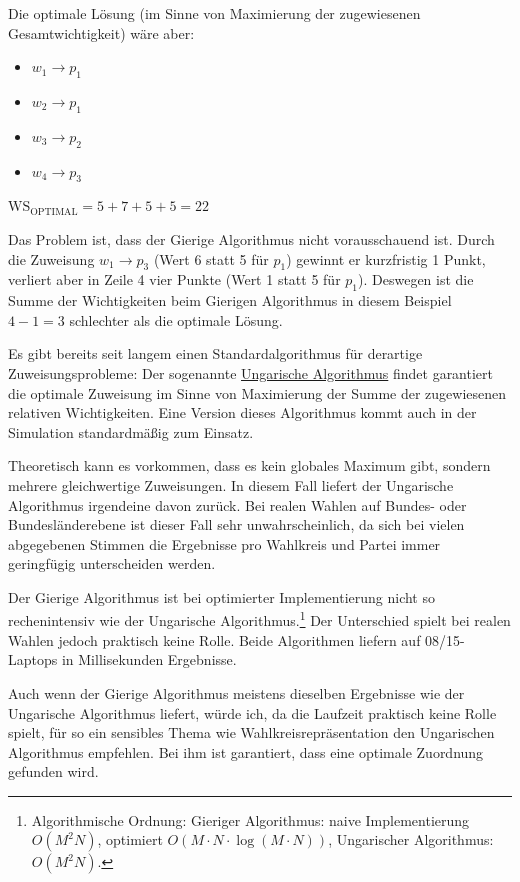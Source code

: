 Die optimale Lösung (im Sinne von Maximierung der zugewiesenen Gesamtwichtigkeit) wäre aber:
\begin{itemize}[label={}]
  \item $w_1 \longrightarrow p_1$
  \item $w_2 \longrightarrow p_1$
  \item $w_3 \longrightarrow p_2$
  \item $w_4 \longrightarrow p_3$
\end{itemize}

$\mathrm{WS}_{\mathrm{OPTIMAL}} = 5 + 7 + 5 + 5 = 22$

Das Problem ist, dass der Gierige Algorithmus nicht vorausschauend ist. Durch die Zuweisung
$w_1 \to p_3$ (Wert 6 statt 5 für $p_1$) gewinnt er kurzfristig 1 Punkt, verliert aber in Zeile
4 vier Punkte (Wert 1 statt 5 für $p_1$). Deswegen ist die Summe der Wichtigkeiten beim Gierigen
Algorithmus in diesem Beispiel $4 - 1 = 3$ schlechter als die optimale Lösung.

Es gibt bereits seit langem einen Standardalgorithmus für derartige Zuweisungsprobleme: Der
sogenannte \href{https://de.wikipedia.org/wiki/Ungarische\_Methode}{Ungarische Algorithmus}
findet garantiert die optimale Zuweisung im Sinne von Maximierung der Summe der zugewiesenen
relativen Wichtigkeiten. Eine Version dieses Algorithmus kommt auch in der Simulation
standardmäßig zum Einsatz.

 Theoretisch kann es vorkommen, dass es kein globales Maximum gibt, sondern
mehrere gleichwertige Zuweisungen. In diesem Fall liefert der Ungarische Algorithmus irgendeine
davon zurück. Bei realen Wahlen auf Bundes- oder Bundesländerebene ist dieser Fall sehr
unwahrscheinlich, da sich bei vielen abgegebenen Stimmen die Ergebnisse pro Wahlkreis und Partei
immer geringfügig unterscheiden werden.

Der Gierige Algorithmus ist bei optimierter Implementierung nicht so rechenintensiv wie der
Ungarische Algorithmus.\footnote{Algorithmische Ordnung: Gieriger Algorithmus: naive
Implementierung $O(M^2 N)$, optimiert $O(M \cdot N \cdot \log(M \cdot N))$, Ungarischer
Algorithmus: $O(M^2 N)$.} Der Unterschied spielt bei realen Wahlen jedoch praktisch keine Rolle.
Beide Algorithmen liefern auf 08/15-Laptops in Millisekunden Ergebnisse.

Auch wenn der Gierige Algorithmus meistens dieselben Ergebnisse wie der Ungarische Algorithmus
liefert, würde ich, da die Laufzeit praktisch keine Rolle spielt, für so ein sensibles Thema wie
Wahlkreisrepräsentation den Ungarischen Algorithmus empfehlen. Bei ihm ist garantiert, dass eine
optimale Zuordnung gefunden wird.
